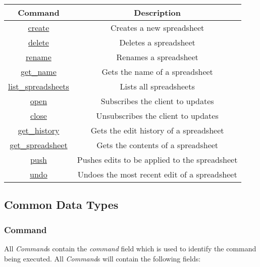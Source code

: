 \begin{table}[H]
    \begin{center}
        \begin{tabular}{|c|c|}\hline
        Command & Description \\\hline
        \hyperref[sec:message:create]{create} & Creates a new spreadsheet \\\hline
        \hyperref[sec:message:delete]{delete} & Deletes a spreadsheet \\\hline
        \hyperref[sec:message:rename]{rename} & Renames a spreadsheet \\\hline
        \hyperref[sec:message:get_name]{get\_name} & Gets the name of a spreadsheet \\\hline
        \hyperref[sec:message:list]{list\_spreadsheets} & Lists all spreadsheets \\\hline
        \hyperref[sec:message:open]{open} & Subscribes the client to updates \\\hline
        \hyperref[sec:message:close]{close} & Unsubscribes the client to updates \\\hline
        \hyperref[sec:message:get_history]{get\_history} & Gets the edit history of a spreadsheet \\\hline
        \hyperref[sec:message:get_spreadsheet]{get\_spreadsheet} & Gets the contents of a spreadsheet \\\hline
        \hyperref[sec:message:push]{push} & Pushes edits to be applied to the spreadsheet \\\hline
        \hyperref[sec:message:undo]{undo} & Undoes the most recent edit of a spreadsheet \\\hline
        \end{tabular}
    \end{center}
\end{table}

\lstset{language=json,frame=single,numbers=none,captionpos=b}

\subsection{Common Data Types}

\subsubsection{Command}
\label{sec:message:command}

All \emph{Command}s contain the \emph{command} field which is used to identify the command being executed.
All \emph{Command}s will contain the following fields:

